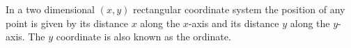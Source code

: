 In a two dimensional $(x,y)$ rectangular coordinate system the position of any point is given by its distance $x$ along the $x$-axis and its distance $y$ along the $y$-axis. The $y$ coordinate is also known as the ordinate.